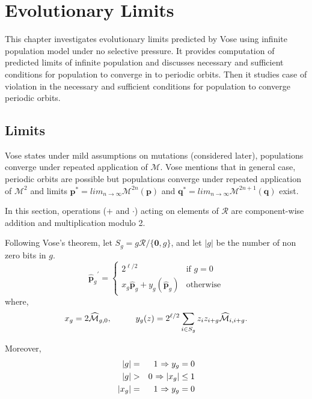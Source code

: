 \chapter{Evolutionary Limits} \label{ch:evolutionary limits}
This chapter investigates evolutionary limits predicted by Vose using infinite population model under no selective pressure. 
It provides computation of predicted limits of infinite population and discusses necessary and sufficient conditions for 
population to converge in to periodic orbits. Then it studies case of violation in the necessary and sufficient conditions 
for population to converge periodic orbits.

\section{Limits}
\label{Limits}
Vose states under mild assumptions on mutations (considered later), populations converge under repeated application 
of $\mathcal{M}$. Vose mentions that in general case, periodic orbits are possible but populations converge under 
repeated application of $\mathcal{M}^2$ and limits ${\bm p}^\ast = lim_{n \rightarrow \infty} \mathcal{M}^{2n}({\bm p})$ 
and ${\bm q}^\ast = lim_{n \rightarrow \infty} \mathcal{M}^{2n+1}({\bm q})$ exist.

In this section, operations ($+$ and $\cdot$) acting on elements of $\mathcal{R}$ are component-wise addition and multiplication modulo 2. 

Following Vose's theorem, let $S_g = g \mathcal{R} / \{\textbf{0}, g\}$, and let $|g|$ be the number of non zero bits in $g$.
\[
{{\widehat{{\bm p}}}_g}^{\prime}  = \begin{cases}
    2^{\ell /2}  & \text{if $g = 0$}\\
    x_g \widehat{{\bm p}}_g + y_g(\widehat{{\bm p}}_g) & \text{otherwise}
  \end{cases}
\]
where,
\[
x_g = 2\widehat{\mathcal{M}}_{g,0},  \hspace*{1cm} y_g(z) = 2^{\ell /2} \sum_{i \in S_g} z_i z_{i+g} \widehat{\mathcal{M}}_{i,i+g}.
\]

Moreover, 
\begin{eqnarray*}
|g| & = & 1 \hspace{0.01in} \Rightarrow y_g = 0 \\
|g| & > & 0 \hspace{0.01in} \Rightarrow |x_g| \leq 1 \\
|x_g| & = & 1 \hspace{0.01in} \Rightarrow y_g = 0
\end{eqnarray*}

